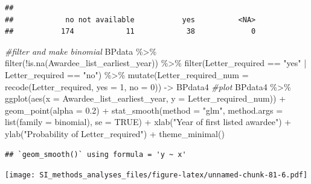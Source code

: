 \documentclass[
]{article}
\newenvironment{Shaded}{\begin{snugshade}}{\end{snugshade}}
\newcommand{\AttributeTok}[1]{\textcolor[rgb]{0.77,0.63,0.00}{#1}}
\newcommand{\CommentTok}[1]{\textcolor[rgb]{0.56,0.35,0.01}{\textit{#1}}}
\newcommand{\ConstantTok}[1]{\textcolor[rgb]{0.00,0.00,0.00}{#1}}
\newcommand{\DecValTok}[1]{\textcolor[rgb]{0.00,0.00,0.81}{#1}}
\newcommand{\FloatTok}[1]{\textcolor[rgb]{0.00,0.00,0.81}{#1}}
\newcommand{\FunctionTok}[1]{\textcolor[rgb]{0.00,0.00,0.00}{#1}}
\newcommand{\NormalTok}[1]{#1}
\newcommand{\OtherTok}[1]{\textcolor[rgb]{0.56,0.35,0.01}{#1}}
\newcommand{\SpecialCharTok}[1]{\textcolor[rgb]{0.00,0.00,0.00}{#1}}
\newcommand{\StringTok}[1]{\textcolor[rgb]{0.31,0.60,0.02}{#1}}
\begin{document}
\begin{verbatim}
## 
##            no not available           yes          <NA> 
##           174            11            38             0
\end{verbatim}

\begin{Shaded}
\begin{Highlighting}[]
\CommentTok{\#filter and make binomial }
\NormalTok{BPdata }\SpecialCharTok{\%\textgreater{}\%} 
  \FunctionTok{filter}\NormalTok{(}\SpecialCharTok{!}\FunctionTok{is.na}\NormalTok{(Awardee\_list\_earliest\_year)) }\SpecialCharTok{\%\textgreater{}\%} 
  \FunctionTok{filter}\NormalTok{(Letter\_required }\SpecialCharTok{==} \StringTok{"yes"} \SpecialCharTok{|}\NormalTok{ Letter\_required }\SpecialCharTok{==} \StringTok{"no"}\NormalTok{) }\SpecialCharTok{\%\textgreater{}\%}  
  \FunctionTok{mutate}\NormalTok{(}\AttributeTok{Letter\_required\_num =} \FunctionTok{recode}\NormalTok{(Letter\_required, }\AttributeTok{yes =} \DecValTok{1}\NormalTok{, }\AttributeTok{no =} \DecValTok{0}\NormalTok{)) }\OtherTok{{-}\textgreater{}}\NormalTok{ BPdata4}
\CommentTok{\#plot}
\NormalTok{BPdata4  }\SpecialCharTok{\%\textgreater{}\%} 
  \FunctionTok{ggplot}\NormalTok{(}\FunctionTok{aes}\NormalTok{(}\AttributeTok{x =}\NormalTok{ Awardee\_list\_earliest\_year, }\AttributeTok{y =}\NormalTok{ Letter\_required\_num)) }\SpecialCharTok{+} 
  \FunctionTok{geom\_point}\NormalTok{(}\AttributeTok{alpha =} \FloatTok{0.2}\NormalTok{) }\SpecialCharTok{+} 
  \FunctionTok{stat\_smooth}\NormalTok{(}\AttributeTok{method =} \StringTok{"glm"}\NormalTok{, }\AttributeTok{method.args =} \FunctionTok{list}\NormalTok{(}\AttributeTok{family =}\NormalTok{ binomial), }\AttributeTok{se =} \ConstantTok{TRUE}\NormalTok{) }\SpecialCharTok{+}
  \FunctionTok{xlab}\NormalTok{(}\StringTok{"Year of first listed awardee"}\NormalTok{) }\SpecialCharTok{+} 
  \FunctionTok{ylab}\NormalTok{(}\StringTok{"Probability of Letter\_required"}\NormalTok{) }\SpecialCharTok{+}
  \FunctionTok{theme\_minimal}\NormalTok{()}
\end{Highlighting}
\end{Shaded}

\begin{verbatim}
## `geom_smooth()` using formula = 'y ~ x'
\end{verbatim}

\texttt{[image: SI\_methods\_analyses\_files/figure-latex/unnamed-chunk-81-6.pdf]}
\end{document}
